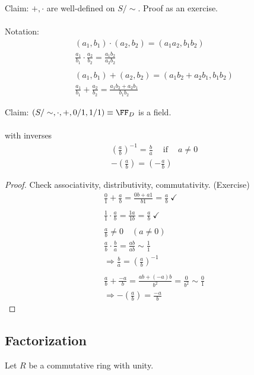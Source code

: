 \documentclass[class=scrartcl, crop=false]{standalone}
\begin{document}
Claim: $+, \cdot$ are well-defined on $S / \sim$. Proof as an exercise.
\\\\
Notation:
\begin{gather*}
  (a_1, b_1) \cdot (a_2, b_2) = (a_1a_2, b_1b_2) \\
  \frac{a_1}{b_1} \cdot \frac{a_2}{b_2} = \frac{a_1b_2}{a_2b_2}
  \\\\
  (a_1, b_1) + (a_2, b_2) = (a_1b_2 + a_2b_1, b_1b_2) \\
  \frac{a_1}{b_1} + \frac{a_2}{b_2} = \frac{a_1b_2 + a_2b_1}{b_1b_2}
\end{gather*} 

Claim: $(S / \sim, \cdot, + , 0 / 1, 1 / 1) \equiv \FF_D$ is a field.
\\\\
with inverses
\begin{gather*}
  (\frac{a}{b})^{-1} = \frac{b}{a} \quad \ \text{if} \ \quad a \neq 0
  \\
  -(\frac{a}{b}) = (-\frac{a}{b})
\end{gather*} 

\begin{proof}
  Check associativity, distributivity, commutativity. (Exercise)
  \begin{gather*}
    \frac{0}{1} + \frac{a}{b} = \frac{0b + a 1}{b 1} = \frac{a}{b} \ \checkmark
    \\\\
    \frac{1}{1} \cdot \frac{a}{b} = \frac{1a}{1b} = \frac{a}{b} \ \checkmark
    \\\\
    \frac{a}{b} \neq 0 \quad (a \neq 0) \\
    \frac{a}{b} \cdot \frac{b}{a} = \frac{ab}{ab} \sim \frac{1}{1} \\
    \Rightarrow \frac{b}{a} = (\frac{a}{b})^{-1}
    \\\\
    \frac{a}{b} + \frac{-a}{b} = \frac{ab + (-a)b}{b^2} = \frac{0}{b^2} \sim \frac{0}{1} \\
    \Rightarrow -(\frac{a}{b}) = \frac{-a}{b}
  \end{gather*} 
\end{proof} 


\subsection{Factorization}

Let $R$ be a commutative ring with unity.
\end{document}

